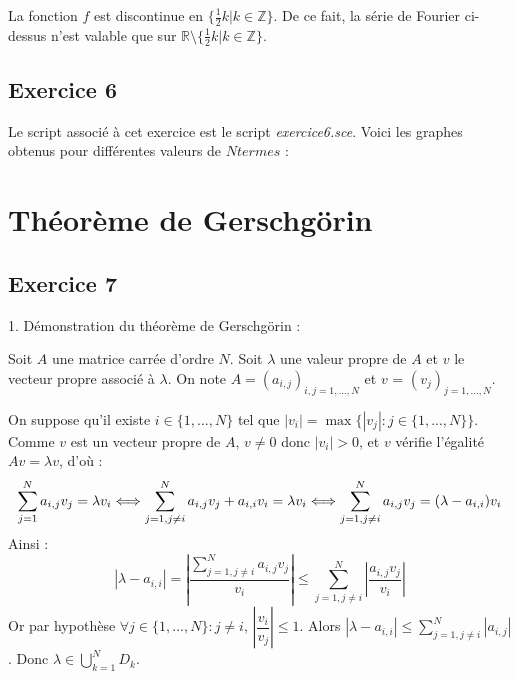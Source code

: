 \documentclass[a4paper,11pt]{article}
\begin{document}
	La fonction $f$ est discontinue en $\{\frac{1}{2} k | k \in \mathbb{Z}\}$. De ce fait, la série de Fourier ci-dessus n'est valable que sur $\mathbb{R} \setminus \{\frac{1}{2} k | k \in \mathbb{Z}\}$.

\subsection*{Exercice 6}
	Le script associé à cet exercice est le script \textit{exercice6.sce}. Voici les graphes obtenus pour différentes valeurs de $Ntermes$ :
	

\section{Théorème de Gerschgörin}

\subsection*{Exercice 7}

	1. Démonstration du théorème de Gerschgörin :

	Soit $A$ une matrice carrée d'ordre $N$. Soit $\lambda$ une valeur propre de $A$ et $v$ le vecteur propre associé à $\lambda$. On note $A = (a_{i,j})_{i,j=1,...,N}$ et $v$ = $(v_{j})_{j=1,...,N}$.

	On suppose qu'il existe $i \in \{1, ..., N\}$ tel que $|v_{i}| = \max \{ |v_{j}| : j \in \{1, ..., N\}\}$. Comme $v$ est un vecteur propre de $A$, $v \neq 0$ donc $|v_{i}| > 0$, et $v$ vérifie l'égalité $Av = \lambda v$, d'où :
	\begin{equation*}
		\sum_{j = 1}^{N} a_{i, j} v_{j} = \lambda v_{i}
		\Longleftrightarrow \sum_{j = 1, j \neq i}^{N} a_{i, j} v_{j} + a_{i, i} v_{i}= \lambda v_{i} \\
		\Longleftrightarrow \sum_{j = 1, j \neq i}^{N} a_{i, j} v_{j} = (\lambda - a_{i, i}) v_{i}
	\end{equation*}
	Ainsi :
	\begin{equation*}
		|\lambda - a_{i, i}| = \left|\frac{\sum\limits_{j = 1, j \neq i}^{N} a_{i, j} v_{j}}{v_{i}} \right|
		\leqslant \sum_{j = 1, j \neq i}^{N} \left|\frac{a_{i, j} v_{j}}{v_{i}} \right|
	\end{equation*}
	Or par hypothèse $\forall j \in \{1, ..., N\} : j \neq i$, $\left|\dfrac{v_{i}}{v_{j}}\right| \leqslant 1$.
	Alors $|\lambda - a_{i, i}| \leqslant \sum\limits_{j = 1, j \neq i}^{N} |a_{i, j}|$. \newline
	Donc $\lambda \in \bigcup\limits_{k=1}^{N} D_{k}$.
	
\end{document}
